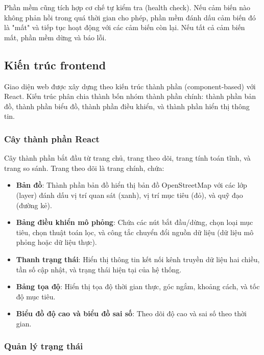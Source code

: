 Phần mềm cũng tích hợp cơ chế tự kiểm tra (health check). Nếu cảm biến nào không phản hồi trong quá thời gian cho phép, phần mềm đánh dấu cảm biến đó là "mất" và tiếp tục hoạt động với các cảm biến còn lại. Nếu tất cả cảm biến mất, phần mềm dừng và báo lỗi.

\subsection{Kiến trúc frontend}

\hspace{0.5cm} Giao diện web được xây dựng theo kiến trúc thành phần (component-based) với React. Kiến trúc phân chia thành bốn nhóm thành phần chính: thành phần bản đồ, thành phần biểu đồ, thành phần điều khiển, và thành phần hiển thị thông tin.

\subsubsection{Cây thành phần React}

\hspace{0.5cm} Cây thành phần bắt đầu từ trang chủ, trang theo dõi, trang tính toán tĩnh, và trang so sánh. Trang theo dõi là trang chính, chứa:

\begin{itemize}
    \item \textbf{Bản đồ}: Thành phần bản đồ hiển thị bản đồ OpenStreetMap với các lớp (layer) đánh dấu vị trí quan sát (xanh), vị trí mục tiêu (đỏ), và quỹ đạo (đường kẻ).
    \item \textbf{Bảng điều khiển mô phỏng}: Chứa các nút bắt đầu/dừng, chọn loại mục tiêu, chọn thuật toán lọc, và công tắc chuyển đổi nguồn dữ liệu (dữ liệu mô phỏng hoặc dữ liệu thực).
    \item \textbf{Thanh trạng thái}: Hiển thị thông tin kết nối kênh truyền dữ liệu hai chiều, tần số cập nhật, và trạng thái hiện tại của hệ thống.
    \item \textbf{Bảng tọa độ}: Hiển thị tọa độ thời gian thực, góc ngắm, khoảng cách, và tốc độ mục tiêu.
    \item \textbf{Biểu đồ độ cao và biểu đồ sai số}: Theo dõi độ cao và sai số theo thời gian.
\end{itemize}

\subsubsection{Quản lý trạng thái}

